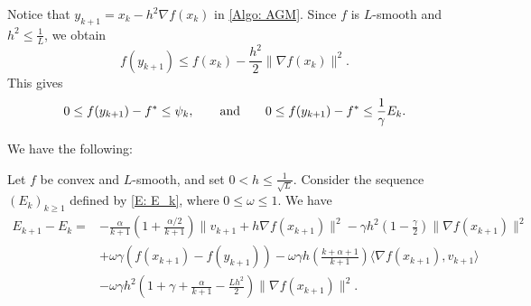 \documentclass[onefignum,onetabnum]{siamart220329}
\newcommand{\qqbox}[1]{\qquad\hbox{#1}\qquad}
\begin{document}
\begin{remark}
Notice that $y_{k+1} = x_k - h^2\nabla f(x_k)$ in \eqref{Algo: AGM}. Since $f$ is $L$-smooth and $h^2\le \frac{1}{L}$, we obtain
$$ f(y_{k+1}) \le f(x_k) - \frac{h^2}{2}\| \nabla f(x_k) \|^2.$$
This gives
$$ 0 \le f(y_{k+1}) - f^*  \le \psi_k,\qqbox{and} 0 \le f(y_{k+1}) - f^*  \le \frac{1}{\gamma}E_k.$$
\end{remark}

We have the following:

\begin{proposition} \label{P:Delta_Ek}
Let $f$ be convex and $L$-smooth, and set $0<h\le \frac{1}{\sqrt{L}}$. Consider the sequence $(E_k)_{k\ge 1}$ defined by \eqref{E: E_k}, where $0\le\omega\le 1$. We have  
\begin{align*}
E_{k+1} - E_k 
=&    -\tfrac{\alpha}{k+1}\left( 1 + \tfrac{\alpha/2}{k+1} \right)\| v_{k+1} + h\nabla f(x_{k+1}) \|^2
   -\gamma h^2 \left(1-\tfrac{\gamma}{2}\right)\| \nabla f(x_{k+1}) \|^2 \\
   & +\omega\gamma \left(f(x_{k+1}) - f(y_{k+1})  \right) 
   -\omega\gamma h\left(\tfrac{k+\alpha+1}{k+1}\right) \langle \nabla f(x_{k+1}), v_{k+1} \rangle \\
&  -\omega\gamma h^2 \left(1+\gamma+\tfrac{\alpha}{k+1}-\tfrac{L h^2}{2}\right)\| \nabla f(x_{k+1}) \|^2  .
\end{align*}
\end{proposition}
\end{document}

